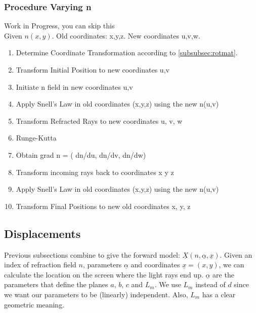 \documentclass{article}
\begin{document}
\subsubsection{Procedure Varying n}
{\color{red} Work in Progress, you can skip this} \\
Given $n(x,y)$. Old coordinates: x,y,z. New coordinates u,v,w.
\begin{enumerate}
	\item Determine Coordinate Transformation according to \ref{subsubsec:rotmat}. \\
	\item Transform Initial Position to new coordinates u,v  \\
	\item Initiate n field in new coordinates u,v \\
	\item  Apply Snell's Law in old coordinates (x,y,z) using the new n(u,v) \\
	\item Transform Refracted Rays to new coordinates u, v, w \\
	\item  Runge-Kutta \\
	\item  Obtain grad n = ( dn/du, dn/dv, dn/dw) \\
	\item  Transform incoming rays back to coordinates x y z \\
	\item  Apply Snell's Law in old coordinates (x,y,z) using the new n(u,v) \\
	\item Transform Final Positions to new old coordinates x, y, z \\
\end{enumerate} 

\subsection{Displacements}
Previous subsections combine to give the forward model: $\underline{X}(n,\underline{\alpha}, \underline{x})$. Given an index of refraction field $n$, parameters $\underline{\alpha}$ and coordinates $\underline{x} = (x,y)$, we can calculate the location on the screen where the light rays end up. $\underline{\alpha}$ are the parameters that define the planes $a$, $b$, $c$ and $L_m$. We use $L_m$ instead of $d$ since we want our parameters to be (linearly) independent. Also, $L_m$ has a clear geometric meaning.
\end{document}
